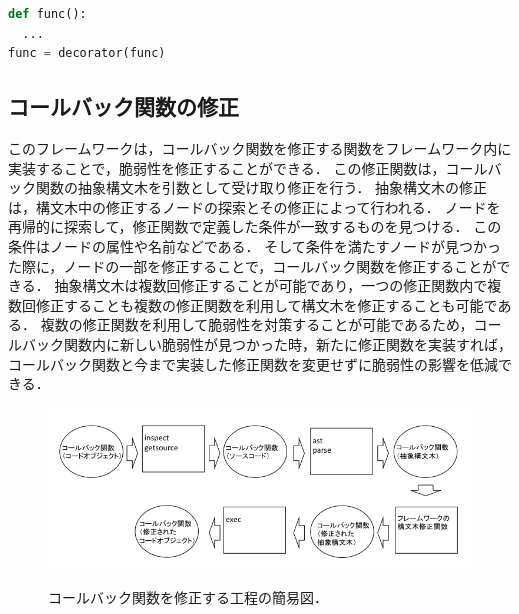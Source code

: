 \documentclass[submit]{ipsj}
\begin{document}
\begin{lstlisting}[language=python]
def func():
  ...
func = decorator(func)
\end{lstlisting}

\subsection{コールバック関数の修正}
このフレームワークは，コールバック関数を修正する関数をフレームワーク内に実装することで，脆弱性を修正することができる．
この修正関数は，コールバック関数の抽象構文木を引数として受け取り修正を行う．
抽象構文木の修正は，構文木中の修正するノードの探索とその修正によって行われる．
ノードを再帰的に探索して，修正関数で定義した条件が一致するものを見つける．
この条件はノードの属性や名前などである．
そして条件を満たすノードが見つかった際に，ノードの一部を修正することで，コールバック関数を修正することができる．
抽象構文木は複数回修正することが可能であり，一つの修正関数内で複数回修正することも複数の修正関数を利用して構文木を修正することも可能である．
複数の修正関数を利用して脆弱性を対策することが可能であるため，コールバック関数内に新しい脆弱性が見つかった時，新たに修正関数を実装すれば，コールバック関数と今まで実装した修正関数を変更せずに脆弱性の影響を低減できる．


\begin{figure}[tb]
\begin{centering}
\includegraphics[width=17.6cm]{./figures/easy_diagram.png}
\caption{コールバック関数を修正する工程の簡易図．}
\label{fig:fixer}
\end{centering}
\end{figure}
\end{document}

